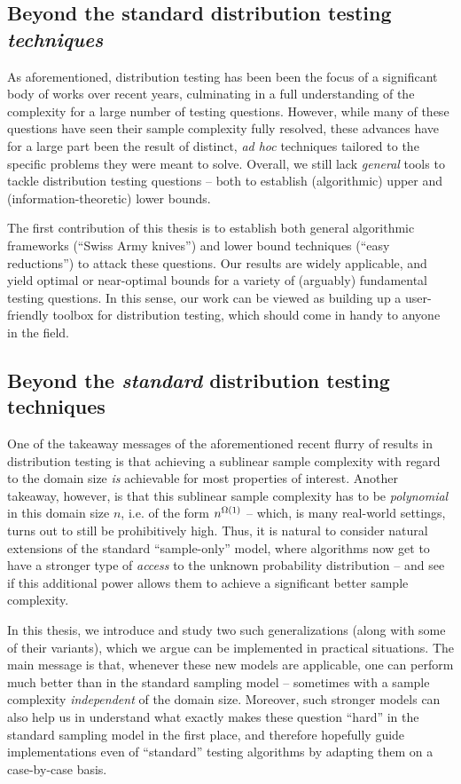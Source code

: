 \subsection*{Beyond the standard distribution testing \emph{techniques}}  As aforementioned, distribution testing has been been the focus of a significant body of works over recent years, culminating in a full understanding of the complexity for a large number of testing questions. However, while many of these questions have seen their sample complexity fully resolved, these advances have for a large part been the result of distinct, \textit{ad hoc} techniques tailored to the specific problems they were meant to solve. Overall, we still lack \emph{general} tools to tackle distribution testing questions -- both to establish (algorithmic) upper and (information-theoretic) lower bounds.

The first contribution of this thesis is to establish both general algorithmic frameworks (``Swiss Army knives'') and lower bound techniques (``easy reductions'') to attack these questions. Our results are widely applicable, and yield optimal or near-optimal bounds for a variety of (arguably) fundamental testing questions. In this sense, our work can be viewed as building up a user-friendly toolbox for distribution testing, which should come in handy to anyone in the field.

\subsection*{Beyond the \emph{standard} distribution testing techniques} One of the takeaway messages of the aforementioned recent flurry of results in distribution testing is that achieving a sublinear sample complexity with regard to the domain size \emph{is} achievable for most properties of interest. Another takeaway, however, is that this sublinear sample complexity has to be \emph{polynomial} in this domain size $n$, i.e. of the form $n^{\bigOmega{1}}$ -- which, is many real-world settings, turns out to still be prohibitively high. Thus, it is natural to consider natural extensions of the standard ``sample-only'' model, where algorithms now get to have a stronger type of \emph{access} to the unknown probability distribution -- and see if this additional power allows them to achieve a significant better sample complexity. 

In this thesis, we introduce and study two such generalizations (along with some of their variants), which we argue can be implemented in practical situations. The main message is that, whenever these new models are applicable, one can perform much better than in the standard sampling model -- sometimes with a sample complexity \emph{independent} of the domain size. Moreover, such stronger models can also help us in understand what exactly makes these question ``hard'' in the standard sampling model in the first place, and therefore hopefully guide implementations even of ``standard'' testing algorithms by adapting them on a case-by-case basis.

